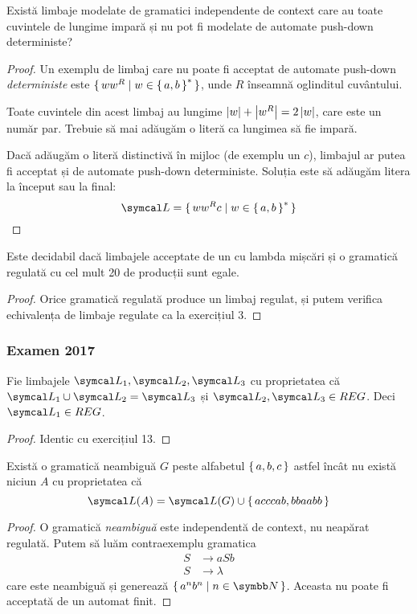 \begin{exercise}
    Există limbaje modelate de gramatici independente de context care au toate cuvintele de lungime impară și nu pot fi modelate de automate push-down deterministe?
\end{exercise}
\begin{proof}
    Un exemplu de limbaj care nu poate fi acceptat de automate push-down \emph{deterministe} este \(\set{ w w^R | w \in \set{a, b}^* }\), unde \(R\) înseamnă oglinditul cuvântului.

    Toate cuvintele din acest limbaj au lungime \(\left\lvert w\right\rvert + \left\lvert w^R\right\rvert = 2 \left\lvert w\right\rvert\), care este un număr par. Trebuie să mai adăugăm o literă ca lungimea să fie impară.

    Dacă adăugăm o literă distinctivă în mijloc (de exemplu un \(c\)), limbajul ar putea fi acceptat și de automate push-down deterministe. Soluția este să adăugăm litera la început sau la final:
    \[\limbaj = \set{ w w^R c | w \in \set{a, b}^* }\]
\end{proof}

\begin{exercise}
    Este decidabil dacă limbajele acceptate de un \nfa{} cu lambda mișcări și o gramatică regulată cu cel mult 20 de producții sunt egale.
\end{exercise}
\begin{proof}
    Orice gramatică regulată produce un limbaj regulat, și putem verifica echivalența de limbaje regulate ca la exercițiul 3.
\end{proof}

\subsubsection*{Examen 2017}

\begin{exercise}
    Fie limbajele \(\limbaj_1, \limbaj_2, \limbaj_3\) cu proprietatea că \(\limbaj_1 \cup \limbaj_2 = \limbaj_3\) și \(\limbaj_2, \limbaj_3 \in REG\). Deci \(\limbaj_1 \in REG\).
\end{exercise}
\begin{proof}
    Identic cu exercițiul 13.
\end{proof}

\begin{exercise}
    Există o gramatică neambiguă \(G\) peste alfabetul \(\set{ a, b, c }\) astfel încât nu există niciun \nfa{} \(A\) cu proprietatea că
    \[\limbaj(A) = \limbaj(G) \cup \set{ acccab, bbaabb }\]
\end{exercise}
\begin{proof}
    O gramatică \emph{neambiguă} este independentă de context, nu neapărat regulată. Putem să luăm contraexemplu gramatica
    \begin{align*}
        S & \rightarrow aSb     \\
        S & \rightarrow \lambda
    \end{align*}
    care este neambiguă și generează \(\set{ a^n b^n | n \in \naturals }\). Aceasta nu poate fi acceptată de un automat finit.
\end{proof}

